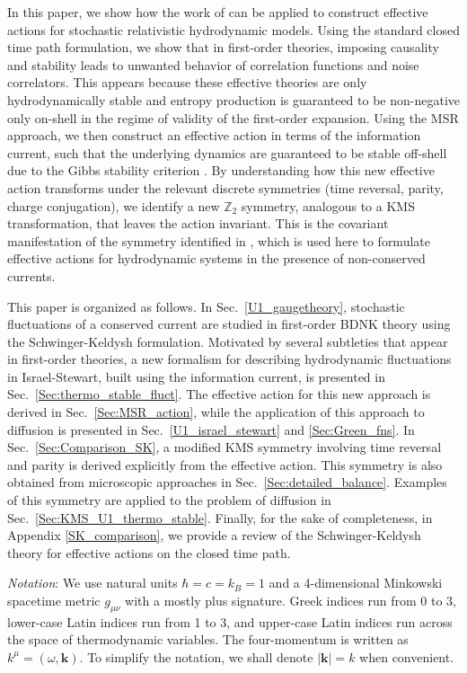 \documentclass[aps,prd,nofootinbib,amsmath,amssymb,showpacs,longbibliography,singlecolumn,superscriptaddress,notitlepage]{revtex4-1}
\theoremstyle{plain}
\theoremstyle{definition}
\begin{document}
In this paper, we show how the work of \cite{Mullins:2023tjg} can be applied to construct effective actions for stochastic relativistic hydrodynamic models. Using the standard closed time path formulation, we show that in first-order theories, imposing causality and stability leads to unwanted behavior of correlation functions and noise correlators. This appears because these effective theories are only hydrodynamically stable and entropy production is guaranteed to be non-negative only on-shell in the regime of validity of the first-order expansion. Using the MSR approach, we then construct an effective action in terms of the information current, such that the underlying dynamics are guaranteed to be stable off-shell due to the Gibbs stability criterion \cite{Gavassino:2021cli}. By understanding how this new effective action transforms under the relevant discrete symmetries (time reversal, parity, charge conjugation), we identify a new $\mathds{Z}_2$ symmetry, analogous to a KMS transformation, that leaves the action invariant. This is the covariant manifestation of the symmetry identified in \cite{Guo:2022ixk}, which is used here to formulate effective actions for hydrodynamic systems in the presence of non-conserved currents.

This paper is organized as follows. In Sec.\ \ref{U1_gaugetheory}, stochastic fluctuations of a conserved current are studied in first-order BDNK theory using the Schwinger-Keldysh formulation. Motivated by several subtleties that appear in first-order theories, a new formalism for describing hydrodynamic fluctuations in Israel-Stewart, built using the information current, is presented in Sec.\ \ref{Sec:thermo_stable_fluct}. The effective action for this new approach is derived in Sec.\ \ref{Sec:MSR_action}, while the application of this approach to diffusion is presented in Sec.\ \ref{U1_israel_stewart} and \ref{Sec:Green_fns}. In Sec.\ \ref{Sec:Comparison_SK}, a modified KMS symmetry involving time reversal and parity is derived explicitly from the effective action. This symmetry is also obtained from microscopic approaches in Sec.\ \ref{Sec:detailed_balance}. Examples of this symmetry are applied to the problem of diffusion in Sec.\ \ref{Sec:KMS_U1_thermo_stable}. Finally, for the sake of completeness, in Appendix \ref{SK_comparison}, we provide a review of the Schwinger-Keldysh theory for effective actions on the closed time path. 



\emph{Notation}: We use natural units $\hbar=c=k_B=1$ and a 4-dimensional Minkowski spacetime metric $g_{\mu\nu}$ with a mostly plus signature. Greek indices
run from 0 to 3, lower-case Latin indices run from 1 to 3, and upper-case Latin indices run across the space of thermodynamic variables. The four-momentum is written as $k^{\mu} = (\omega, \mathbf{k})$. To simplify the notation, we shall denote $|\mathbf{k}|=k$ when convenient. 
\end{document}
